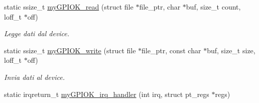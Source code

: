 \begin{DoxyCompactItemize}
static ssize\+\_\+t \hyperlink{group___kernel-_module_ga90ac339df9c02ae5f11a2a7727adc923}{my\+G\+P\+I\+O\+K\+\_\+read} (struct file $\ast$file\+\_\+ptr, char $\ast$buf, size\+\_\+t count, loff\+\_\+t $\ast$off)
\begin{DoxyCompactList}\small\item\em Legge dati dal device. \end{DoxyCompactList}\item 
static ssize\+\_\+t \hyperlink{group___kernel-_module_ga1eea0f6c86e8966ba9b701da57502aad}{my\+G\+P\+I\+O\+K\+\_\+write} (struct file $\ast$file\+\_\+ptr, const char $\ast$buf, size\+\_\+t size, loff\+\_\+t $\ast$off)
\begin{DoxyCompactList}\small\item\em Invia dati al device. \end{DoxyCompactList}\item 
static irqreturn\+\_\+t \hyperlink{group___kernel-_module_ga2fc230a12a97aa63e43b2dc4aec73511}{my\+G\+P\+I\+O\+K\+\_\+irq\+\_\+handler} (int irq, struct pt\+\_\+regs $\ast$regs)
\end{DoxyCompactItemize}
